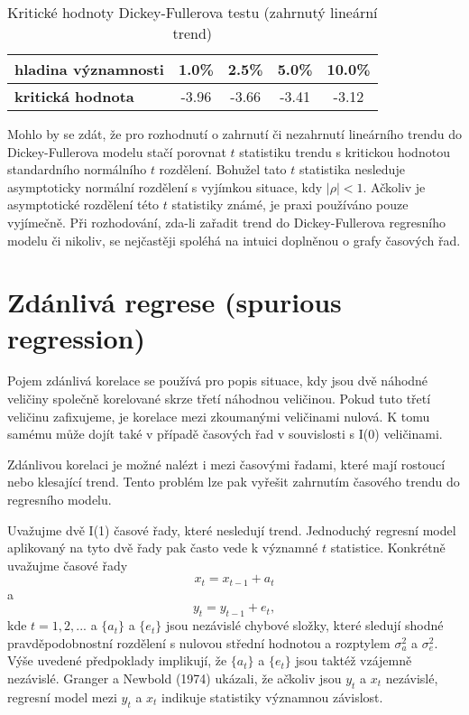 \begin{table}
\begin{center}
\begin{tabular}{| l | c | c | c | c |}
\hline
\bf{hladina významnosti} & 1.0\% & 2.5\% & 5.0\% & 10.0\%\\
\hline
\bf{kritická hodnota} & -3.96 & -3.66 & -3.41 & -3.12\\
\hline
\end{tabular}
\caption{Kritické hodnoty Dickey-Fullerova testu (zahrnutý lineární trend)}
\end{center}
\end{table}

Mohlo by se zdát, že pro rozhodnutí o zahrnutí či nezahrnutí lineárního trendu do Dickey-Fullerova modelu 
stačí porovnat $t$ statistiku trendu s kritickou hodnotou standardního normálního $t$ rozdělení. Bohužel tato 
$t$ statistika nesleduje asymptoticky normální rozdělení s 
vyjímkou situace, kdy $|\rho| < 1$. Ačkoliv je asymptotické rozdělení této 
$t$ statistiky známé, je praxi používáno pouze vyjímečně. Při rozhodování, zda-li zařadit trend do 
Dickey-Fullerova regresního modelu či nikoliv, se nejčastěji spoléhá na intuici doplněnou o grafy časových řad.

\section{Zdánlivá regrese (spurious regression)}

Pojem zdánlivá korelace se používá pro popis situace, kdy jsou dvě náhodné veličiny společně korelované 
skrze třetí náhodnou veličinou. Pokud tuto třetí veličinu zafixujeme, je korelace mezi 
zkoumanými veličinami nulová. K tomu samému může dojít také v případě časových řad v souvislosti s I(0) veličinami.

Zdánlivou korelaci je možné nalézt i mezi časovými řadami, které mají rostoucí nebo klesající trend. 
Tento problém lze pak vyřešit zahrnutím časového trendu do regresního modelu.

Uvažujme dvě I(1) časové řady, které nesledují trend. Jednoduchý regresní model aplikovaný na tyto dvě řady 
pak často vede k významné $t$ statistice. Konkrétně uvažujme časové řady
\begin{equation}
x_t = x_{t - 1} + a_t
\end{equation}
a
\begin{equation}
y_t = y_{t - 1} + e_t,
\end{equation}
kde $t = 1, 2, ...$ a $\{a_t\}$ a $\{e_t\}$ jsou nezávislé chybové složky, které sledují shodné 
pravděpodobnostní rozdělení s nulovou střední hodnotou a rozptylem $\sigma_a^2$ a $\sigma_e^2$. Výše uvedené 
předpoklady implikují, že $\{a_t\}$ a $\{e_t\}$ jsou taktéž vzájemně nezávislé. Granger a Newbold (1974) 
ukázali, že ačkoliv jsou $y_t$ a $x_t$ nezávislé, regresní model mezi $y_t$ a $x_t$ indikuje statistiky 
významnou závislost.

